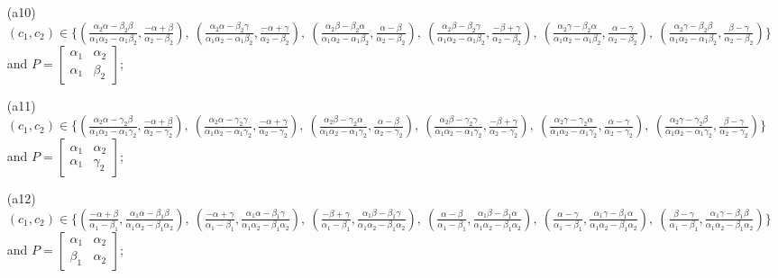 \begin{enumerate}
\item[(a10)] $(c_1,c_2)\in \{(\frac{\alpha_2 \alpha  - \beta_2 \beta }{\alpha_1 \alpha_2 - \alpha_1 \beta_2},\frac{-\alpha  + \beta }{\alpha_2 - \beta_2}),\allowbreak\ (\frac{\alpha_2 \alpha  - \beta_2 \gamma }{\alpha_1 \alpha_2 - \alpha_1 \beta_2},\frac{-\alpha  + \gamma }{\alpha_2 - \beta_2}),\allowbreak\ (\frac{\alpha_2 \beta  - \beta_2 \alpha }{\alpha_1 \alpha_2 - \alpha_1 \beta_2},\frac{\alpha  - \beta }{\alpha_2 - \beta_2}),\allowbreak\ (\frac{\alpha_2 \beta  - \beta_2 \gamma }{\alpha_1 \alpha_2 - \alpha_1 \beta_2},\frac{-\beta  + \gamma }{\alpha_2 - \beta_2}),\allowbreak\ (\frac{\alpha_2 \gamma  - \beta_2 \alpha }{\alpha_1 \alpha_2 - \alpha_1 \beta_2},\frac{\alpha  - \gamma }{\alpha_2 - \beta_2}),\allowbreak\ (\frac{\alpha_2 \gamma  - \beta_2 \beta }{\alpha_1 \alpha_2 - \alpha_1 \beta_2},\frac{\beta  - \gamma }{\alpha_2 - \beta_2})\}$ and $P=\begin{bmatrix}\alpha_1&\alpha_2\\\alpha_1&\beta_2\end{bmatrix}$;
\item[(a11)] $(c_1,c_2)\in \{(\frac{\alpha_2 \alpha  - \gamma_2 \beta }{\alpha_1 \alpha_2 - \alpha_1 \gamma_2},\frac{-\alpha  + \beta }{\alpha_2 - \gamma_2}),\allowbreak\ (\frac{\alpha_2 \alpha  - \gamma_2 \gamma }{\alpha_1 \alpha_2 - \alpha_1 \gamma_2},\frac{-\alpha  + \gamma }{\alpha_2 - \gamma_2}),\allowbreak\ (\frac{\alpha_2 \beta  - \gamma_2 \alpha }{\alpha_1 \alpha_2 - \alpha_1 \gamma_2},\frac{\alpha  - \beta }{\alpha_2 - \gamma_2}),\allowbreak\ (\frac{\alpha_2 \beta  - \gamma_2 \gamma }{\alpha_1 \alpha_2 - \alpha_1 \gamma_2},\frac{-\beta  + \gamma }{\alpha_2 - \gamma_2}),\allowbreak\ (\frac{\alpha_2 \gamma  - \gamma_2 \alpha }{\alpha_1 \alpha_2 - \alpha_1 \gamma_2},\frac{\alpha  - \gamma }{\alpha_2 - \gamma_2}),\allowbreak\ (\frac{\alpha_2 \gamma  - \gamma_2 \beta }{\alpha_1 \alpha_2 - \alpha_1 \gamma_2},\frac{\beta  - \gamma }{\alpha_2 - \gamma_2})\}$ and $P=\begin{bmatrix}\alpha_1&\alpha_2\\\alpha_1&\gamma_2\end{bmatrix}$;
\item[(a12)] $(c_1,c_2)\in \{(\frac{-\alpha  + \beta }{\alpha_1 - \beta_1},\frac{\alpha_1 \alpha  - \beta_1 \beta }{\alpha_1 \alpha_2 - \beta_1 \alpha_2}),\allowbreak\ (\frac{-\alpha  + \gamma }{\alpha_1 - \beta_1},\frac{\alpha_1 \alpha  - \beta_1 \gamma }{\alpha_1 \alpha_2 - \beta_1 \alpha_2}),\allowbreak\ (\frac{-\beta  + \gamma }{\alpha_1 - \beta_1},\frac{\alpha_1 \beta  - \beta_1 \gamma }{\alpha_1 \alpha_2 - \beta_1 \alpha_2}),\allowbreak\ (\frac{\alpha  - \beta }{\alpha_1 - \beta_1},\frac{\alpha_1 \beta  - \beta_1 \alpha }{\alpha_1 \alpha_2 - \beta_1 \alpha_2}),\allowbreak\ (\frac{\alpha  - \gamma }{\alpha_1 - \beta_1},\frac{\alpha_1 \gamma  - \beta_1 \alpha }{\alpha_1 \alpha_2 - \beta_1 \alpha_2}),\allowbreak\ (\frac{\beta  - \gamma }{\alpha_1 - \beta_1},\frac{\alpha_1 \gamma  - \beta_1 \beta }{\alpha_1 \alpha_2 - \beta_1 \alpha_2})\}$ and $P=\begin{bmatrix}\alpha_1&\alpha_2\\\beta_1&\alpha_2\end{bmatrix}$;

\end{enumerate}
